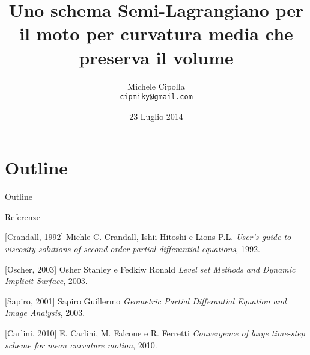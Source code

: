 \documentclass[10pt]{beamer}
\title{Uno schema Semi-Lagrangiano per il moto per curvatura media che
  preserva il volume}
\author{Michele Cipolla \\
\texttt{cipmiky@gmail.com}}
\institute[Dip. Matematica]{Sapienza Università di Roma}
\date{23 Luglio 2014}
\begin{document}
%
%
\begin{frame}
\titlepage
\end{frame}
%
%
\section*{Outline}
\begin{frame}{Outline}
\tableofcontents
\end{frame}
%
%





%
%
\begin{frame}{Referenze}
\begin{thebibliography}{bella}
[Crandall, 1992]
  Michle C. Crandall, Ishii Hitoshi e Lions P.L.
  \newblock \emph{User's guide to viscosity solutions of second order
    partial differantial equations}, 1992.

[Oscher, 2003] 
  Osher Stanley e Fedkiw Ronald
  \newblock \emph{Level set Methods and Dynamic Implicit Surface}, 2003.

[Sapiro, 2001] 
  Sapiro Guillermo
  \newblock \emph{Geometric Partial Differantial Equation and Image
    Analysis}, 2003.

[Carlini, 2010] 
  E. Carlini, M. Falcone e R. Ferretti
  \newblock \emph{Convergence of large time-step scheme for mean
    curvature motion}, 2010.

\end{thebibliography}
\end{frame}
%
%
%
\end{document}

